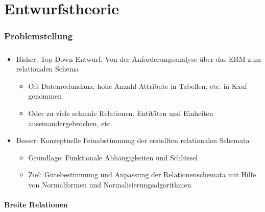 \part{Entwurfstheorie}

\section{Problemstellung}

\begin{frame}\frametitle{\insertsection}
\begin{itemize}
	\item Bisher: Top-Down-Entwurf: Von der Anforderungsanalyse \"uber das ERM zum relationalen Schema
	\begin{itemize}
		\item Oft Datenredundanz, hohe Anzahl Attribute in Tabellen, etc. in Kauf genommen
		\item Oder zu viele schmale Relationen, Entit\"aten und Einheiten auseinandergebrochen, etc.
	\end{itemize}
  \pause
  \abs
	\item Besser: Konzeptuelle Feinabstimmung der erstellten relationalen Schemata
	\begin{itemize}
		\item Grundlage: Funktionale Abh\"angigkeiten und Schl\"ussel
		\item Ziel: G\"utebestimmung und Anpassung der Relationenschemata mit Hilfe von Normalformen und Normalisierungsalgorithmen
	\end{itemize}
	\end{itemize}
\end{frame}

\subsection{Breite Relationen}

